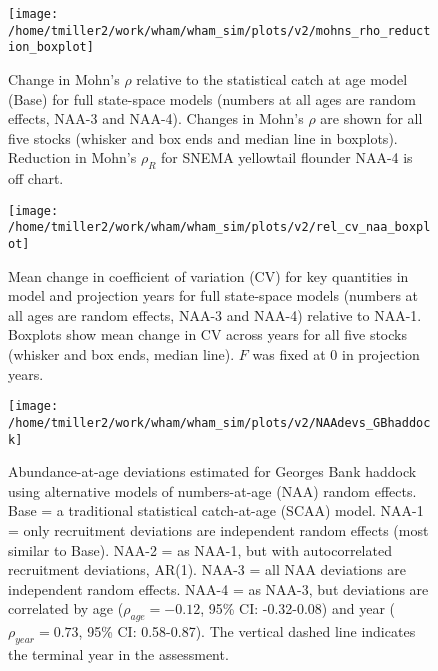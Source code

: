 \documentclass[]{article}
\begin{document}
\begin{figure}

{\centering \texttt{[image: /home/tmiller2/work/wham/wham\_sim/plots/v2/mohns\_rho\_reduction\_boxplot]} 

}

\caption{Change in Mohn's $\rho$ relative to the statistical catch at age model (Base) for full state-space models (numbers at all ages are random effects, NAA-3 and NAA-4). Changes in Mohn's $\rho$ are shown for all five stocks (whisker and box ends and median line in boxplots). Reduction in Mohn's $\rho_R$ for SNEMA yellowtail flounder NAA-4 is off chart.}\label{fig:mohns}
\end{figure}

\pagebreak

\begin{figure}

{\centering \texttt{[image: /home/tmiller2/work/wham/wham\_sim/plots/v2/rel\_cv\_naa\_boxplot]} 

}

\caption{Mean change in coefficient of variation (CV) for key quantities in model and projection years for full state-space models (numbers at all ages are random effects, NAA-3 and NAA-4) relative to NAA-1. Boxplots show mean change in CV across years for all five stocks (whisker and box ends, median line). $F$ was fixed at 0 in projection years.}\label{fig:cv}
\end{figure}

\pagebreak

\begin{figure}

{\centering \texttt{[image: /home/tmiller2/work/wham/wham\_sim/plots/v2/NAAdevs\_GBhaddock]} 

}

\caption{Abundance-at-age deviations estimated for Georges Bank haddock using alternative models of numbers-at-age (NAA) random effects. Base = a traditional statistical catch-at-age (SCAA) model. NAA-1 = only recruitment deviations are independent random effects (most similar to Base). NAA-2 = as NAA-1, but with autocorrelated recruitment deviations, AR(1). NAA-3 = all NAA deviations are independent random effects. NAA-4 = as NAA-3, but deviations are correlated by age ($\rho_{age} = -0.12$, 95\% CI: -0.32-0.08) and year ($\rho_{year} = 0.73$, 95\% CI: 0.58-0.87). The vertical dashed line indicates the terminal year in the assessment.}\label{fig:devs-GBhaddock-naa}
\end{figure}
\end{document}
